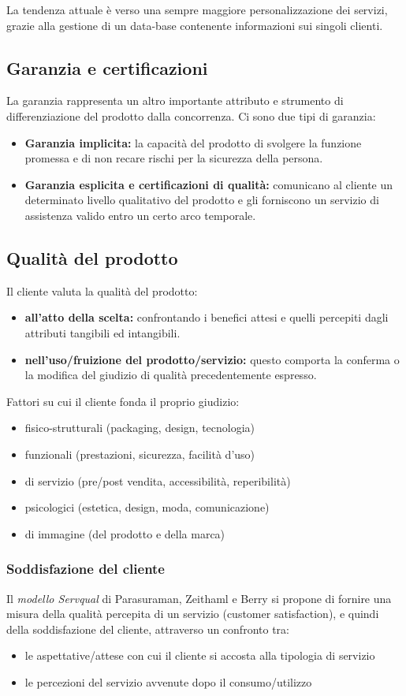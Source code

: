La tendenza attuale è verso una sempre maggiore personalizzazione dei servizi, grazie alla gestione di un data-base contenente informazioni sui singoli clienti.

\subsection{Garanzia e certificazioni}
La garanzia rappresenta un altro importante attributo e strumento di differenziazione del
prodotto dalla concorrenza. Ci sono due tipi di garanzia:
\begin{itemize}
	\item \textbf{Garanzia implicita:} la capacità del prodotto di svolgere la funzione promessa e di non recare rischi per la sicurezza della persona.
	\item \textbf{Garanzia esplicita e certificazioni di qualità:} comunicano al cliente un determinato livello qualitativo del prodotto e gli forniscono un servizio di assistenza valido entro un certo arco temporale.
\end{itemize}

\subsection{Qualità del prodotto}
Il cliente valuta la qualità del prodotto:
\begin{itemize}
	\item \textbf{all’atto della scelta:} confrontando i benefici attesi e quelli percepiti dagli attributi tangibili ed intangibili.
	\item \textbf{nell’uso/fruizione del prodotto/servizio:} questo comporta la conferma o la modifica del giudizio di	qualità precedentemente espresso.
\end{itemize}
Fattori su cui il cliente fonda il proprio giudizio:
\begin{itemize}
	\item fisico-strutturali (packaging, design, tecnologia)
	\item funzionali (prestazioni, sicurezza, facilità d’uso)
	\item di servizio (pre/post vendita, accessibilità, reperibilità)
	\item psicologici (estetica, design, moda, comunicazione)
	\item di immagine (del prodotto e della marca)
\end{itemize}

\subsubsection{Soddisfazione del cliente}
Il \textit{modello Servqual} di Parasuraman, Zeithaml e Berry si propone di fornire una misura della qualità percepita di un servizio (customer satisfaction), e quindi della
soddisfazione del cliente, attraverso un confronto tra:
\begin{itemize}
	\item le aspettative/attese con cui il cliente si accosta alla tipologia di
	servizio
	\item le percezioni del servizio avvenute dopo il consumo/utilizzo
\end{itemize}

